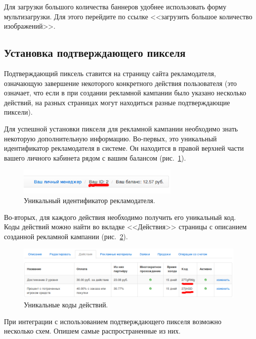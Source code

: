 \documentclass[a4paper,12pt]{article}
\begin{document}
Для загрузки большого количества баннеров удобнее использовать форму мультизагрузки. Для этого перейдите по ссылке <<загрузить большое количество изображений>>.

\subsection{Установка подтверждающего пикселя}
\label{ssec:pixel}

Подтверждающий пиксель ставится на страницу сайта рекламодателя, означающую завершение некоторого конкретного действия пользователя (это означает, что если в при создании рекламной кампании было указано несколько действий, на разных страницах могут находиться разные подтверждающие пиксели).

Для успешной установки пикселя для рекламной кампании необходимо знать некоторую дополнительную информацию. Во-первых, это уникальный идентификатор рекламодателя в системе. Он находится в правой верхней части вашего личного кабинета рядом с вашим балансом (рис.~\ref{fig:advertiser-id}).

\begin{figure}[!ht]
\centering
\includegraphics[width=0.7\textwidth]{include/advertiser-id.png}
\caption{Уникальный идентификатор рекламодателя.}
\label{fig:advertiser-id}
\end{figure}

Во-вторых, для каждого действия необходимо получить его уникальный код. Коды действий можно найти во вкладке <<Действия>> страницы с описанием созданной рекламной кампании (рис.~\ref{fig:suboffer-code}).

\begin{figure}[!ht]
\centering
\includegraphics[width=\textwidth]{include/suboffer-code.png}
\caption{Уникальные коды действий.}
\label{fig:suboffer-code}
\end{figure}

При интеграции с использованием подтверждающего пикселя возможно несколько схем. Опишем самые распространенные из них.
\end{document}
